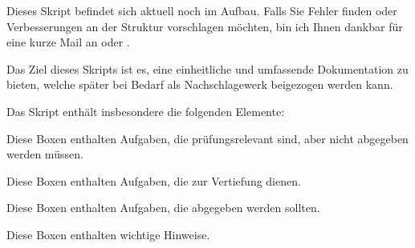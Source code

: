 Dieses Skript befindet sich aktuell noch im Aufbau. Falls Sie Fehler finden oder Verbesserungen an der Struktur
vorschlagen möchten, bin ich Ihnen dankbar für eine kurze Mail an \href{mailto:\mainauthormail}{\mainauthormail} oder \href{mailto:\mainauthormailB}{\mainauthormailB}.

Das Ziel dieses Skripts ist es, eine einheitliche und umfassende Dokumentation zu bieten, welche später bei Bedarf als Nachschlagewerk beigezogen werden kann.

Das Skript enthält insbesondere die folgenden Elemente:

\begin{myexercise}
Diese Boxen enthalten Aufgaben, die prüfungsrelevant sind, aber nicht abgegeben werden müssen.
\end{myexercise}

\begin{mychallenge}
Diese Boxen enthalten Aufgaben, die zur Vertiefung dienen.
\end{mychallenge}

\begin{mysubmission}
Diese Boxen enthalten Aufgaben, die abgegeben werden sollten.
\end{mysubmission}

\begin{mycaution}
Diese Boxen enthalten wichtige Hinweise.
\end{mycaution}